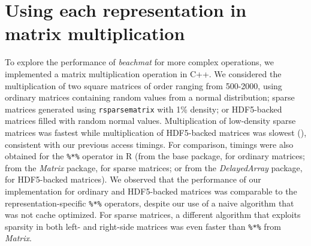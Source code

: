 \documentclass{article}
\newcommand{\beachmat}{\textit{beachmat}}
\newcommand{\code}[1]{\texttt{#1}}
\begin{document}
\section{Using each representation in matrix multiplication}
To explore the performance of \beachmat{} for more complex operations, we implemented a matrix multiplication operation in C++.
We considered the multiplication of two square matrices of order ranging from 500-2000, using ordinary matrices containing random values from a normal distribution;
sparse matrices generated using \code{rsparsematrix} with 1\% density;
or HDF5-backed matrices filled with random normal values.
Multiplication of low-density sparse matrices was fastest while multiplication of HDF5-backed matrices was slowest (\suppfigmatmult{}), consistent with our previous access timings.
For comparison, timings were also obtained for the \code{\%*\%} operator in R (from the base package, for ordinary matrices; 
from the \textit{Matrix} package, for sparse matrices;
or from the \textit{DelayedArray} package, for HDF5-backed matrices).
We observed that the performance of our implementation for ordinary and HDF5-backed matrices was comparable to the representation-specific \code{\%*\%} operators,
despite our use of a naive algorithm that was not cache optimized.
For sparse matrices, a different algorithm that exploits sparsity in both left- and right-side matrices was even faster than \code{\%*\%} from \textit{Matrix}.



\end{document}

